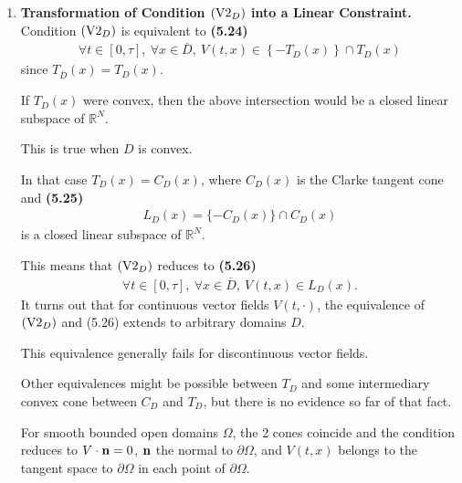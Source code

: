 \documentclass{book}
\numberwithin{equation}{section}
\newtheorem{remark}{Remark}[section]
\begin{document}
\begin{enumerate}
    \begin{remark}
        Condition $({\rm V2}_D)$ is a generalization to an arbitrary set $D$ of the following condition used by J.-P. Zolésio [12] in 1979: for all $x$ in $\partial D$,
        \begin{equation*}
            \left\{\begin{split}
                &V(t,x)\cdot{\bf n}(x) = 0, &&\mbox{ if the outward normal } {\bf n}(x) \mbox{ exists},\\
                &0, &&\mbox{ otherwise}.
            \end{split}\right.
        \end{equation*}
    \end{remark}
    \item \textbf{Transformation of Condition $({\rm V2}_D)$ into a Linear Constraint.} Condition $({\rm V2}_D)$ is equivalent to \textbf{(5.24)}
    \begin{align*}
        \forall t\in[0,\tau],\ \forall x\in\overline{D},\ V(t,x)\in\left\{-T_D(x)\right\}\cap T_D(x)
    \end{align*}
    since $T_{\overline{D}}(x) = T_D(x)$.
    
    If $T_D(x)$ were convex, then the above intersection would be a closed linear subspace of $\mathbb{R}^N$.
    
    This is true when $D$ is convex.
    
    In that case $T_D(x) = C_D(x)$, where $C_D(x)$ is the Clarke tangent cone and \textbf{(5.25)}
    \begin{align*}
        L_D(x) = \{-C_D(x)\}\cap C_D(x)
    \end{align*}
    is a closed linear subspace of $\mathbb{R}^N$.
    
    This means that $({\rm V2}_D)$ reduces to \textbf{(5.26)}
    \begin{align*}
        \forall t\in[0,\tau],\ \forall x\in\overline{D},\ V(t,x)\in L_D(x).
    \end{align*}
    It turns out that for continuous vector fields $V(t,\cdot)$, the equivalence of $({\rm V2}_D)$ and (5.26) extends to arbitrary domains $D$.
    
    This equivalence generally fails for discontinuous vector fields.
    
    Other equivalences might be possible between $T_D$ and some intermediary convex cone between $C_D$ and $T_D$, but there is no evidence so far of that fact.
    
    For smooth bounded open domains $\Omega$, the 2 cones coincide and the condition reduces to $V\cdot{\bf n} = 0$, ${\bf n}$ the normal to $\partial\Omega$, and $V(t,x)$ belongs to the tangent space to $\partial\Omega$ in each point of $\partial\Omega$.
    

\end{enumerate}
\end{document}
